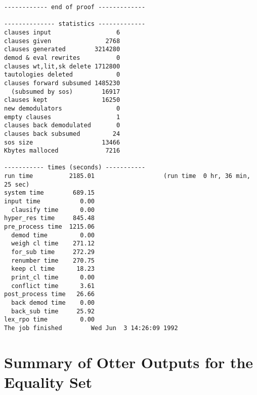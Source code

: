 {\begin{verbatim}
------------ end of proof -------------

-------------- statistics -------------
clauses input                  6
clauses given               2768
clauses generated        3214280
demod & eval rewrites          0
clauses wt,lit,sk delete 1712800
tautologies deleted            0
clauses forward subsumed 1485230
  (subsumed by sos)        16917
clauses kept               16250
new demodulators               0
empty clauses                  1
clauses back demodulated       0
clauses back subsumed         24
sos size                   13466
Kbytes malloced             7216

----------- times (seconds) -----------
run time          2185.01                   (run time  0 hr, 36 min, 25 sec)
system time        689.15
input time           0.00
  clausify time      0.00
hyper_res time     845.48
pre_process time  1215.06
  demod time         0.00
  weigh cl time    271.12
  for_sub time     272.29
  renumber time    270.75
  keep cl time      18.23
  print_cl time      0.00
  conflict time      3.61
post_process time   26.66
  back demod time    0.00
  back_sub time     25.92
lex_rpo time         0.00
The job finished        Wed Jun  3 14:26:09 1992
\end{verbatim} }

\section{Summary of Otter Outputs for the Equality Set}

